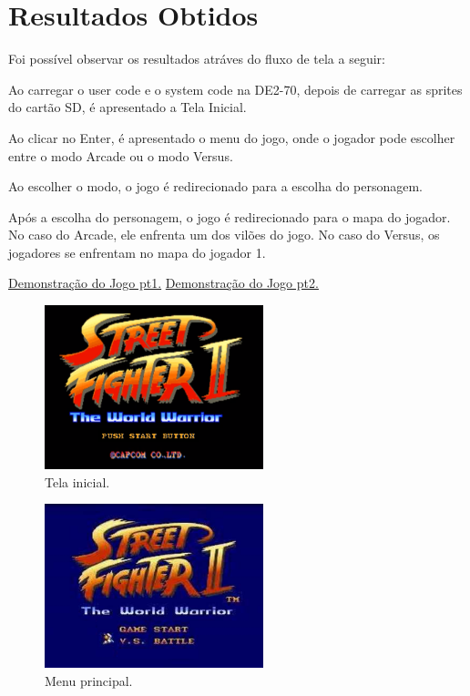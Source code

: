 \documentclass{vgtc}                          %
\begin{document}
\section{Resultados Obtidos}

Foi possível observar os resultados atráves do fluxo de tela a seguir:

Ao carregar o user code e o system code na DE2-70, depois de carregar as sprites do cartão SD, é apresentado a Tela Inicial.

Ao clicar no Enter, é apresentado o menu do jogo, onde o jogador pode escolher entre o modo Arcade ou o modo Versus.

Ao escolher o modo, o jogo é redirecionado para a escolha do personagem.

Após a escolha do personagem, o jogo é redirecionado para o mapa do jogador. No caso do Arcade, ele enfrenta um dos vilões do jogo. No caso do Versus, os jogadores se enfrentam no mapa do jogador 1.

\href{https://youtu.be/0BtsrIDkxic}{Demonstração do Jogo pt1.}
\href{https://youtu.be/fexJ_3Ww0OI}{Demonstração do Jogo pt2.}


\begin{figure}[htbp]
  \centering
  \includegraphics[width=2.5in]{abertura.png}
 \caption{Tela inicial.}
\end{figure}

\begin{figure}[htbp]
  \centering
  \includegraphics[width=2.5in]{versus.png}
 \caption{Menu principal.}
\end{figure}
\end{document}
